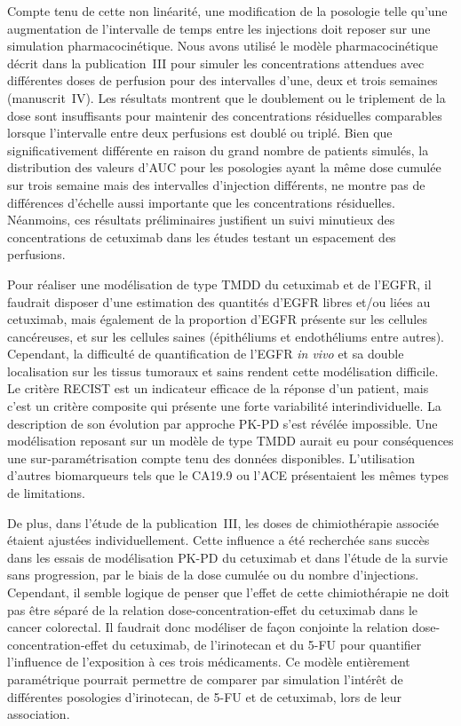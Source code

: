 Compte tenu de cette non linéarité, une modification de la posologie telle qu'une augmentation de l'intervalle de temps entre les injections doit reposer sur une simulation pharmacocinétique. Nous avons utilisé le modèle pharmacocinétique décrit dans la publication~III pour simuler les concentrations attendues avec différentes doses de perfusion pour des intervalles d'une, deux et trois semaines (manuscrit~IV). Les résultats montrent que le doublement ou le triplement de la dose sont insuffisants pour maintenir des concentrations résiduelles comparables lorsque l'intervalle entre deux perfusions est doublé ou triplé. Bien que significativement différente en raison du grand nombre de patients simulés, la distribution des valeurs d'\gls{AUC} pour les posologies ayant la même dose cumulée sur trois semaine mais des intervalles d'injection différents, ne montre pas de différences d'échelle aussi importante que les concentrations résiduelles. Néanmoins, ces résultats préliminaires justifient un suivi minutieux des concentrations de cetuximab dans les études testant un espacement des perfusions.  

Pour réaliser une modélisation de type TMDD du cetuximab et de l'EGFR, il faudrait disposer d'une estimation des quantités d'EGFR libres et/ou liées au cetuximab, mais également de la proportion d'EGFR présente sur les cellules cancéreuses, et sur les cellules saines (épithéliums et endothéliums entre autres). Cependant, la difficulté de quantification de l'EGFR \textit{in vivo} et sa double localisation sur les tissus tumoraux et sains rendent cette modélisation difficile. Le critère RECIST est un indicateur efficace de la réponse d'un patient, mais c'est un critère composite qui présente une forte variabilité interindividuelle. La description de son évolution par approche PK-PD s'est révélée impossible. Une modélisation reposant sur un modèle de type TMDD aurait eu pour conséquences une sur-paramétrisation compte tenu des données disponibles. L'utilisation d'autres biomarqueurs tels que le CA19.9 ou l'ACE présentaient les mêmes types de limitations. 

De plus, dans l'étude de la publication~III, les doses de chimiothérapie associée étaient ajustées individuellement. Cette influence a été recherchée sans succès dans les essais de modélisation PK-PD du cetuximab et dans l'étude de la survie sans progression, par le biais de la dose cumulée ou du nombre d'injections. Cependant, il semble logique de penser que l'effet de cette chimiothérapie ne doit pas être séparé de la relation dose-concentration-effet du cetuximab dans le cancer colorectal. Il faudrait donc modéliser de façon conjointe la relation dose-concentration-effet du cetuximab, de l'irinotecan et du 5-FU pour quantifier l'influence de l'exposition à ces trois médicaments. Ce modèle entièrement paramétrique pourrait permettre de comparer par simulation l'intérêt de différentes posologies d'irinotecan, de 5-FU et de cetuximab, lors de leur association. 

